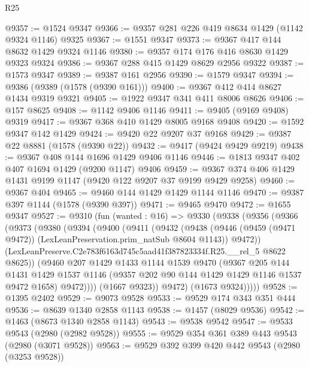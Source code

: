 \begin{lexlean}{R25}
\begin{coremodule}
@9357 := @1524 @9347
@9366 := @9357 @281 @226 @419 @8634 @1429 (@1142 @9324 @1146) @9325
@9367 := @1551 @9347
@9373 := @9367 @417 @144 @8632 @1429 @9324 @1146
@9380 := @9357 @174 @176 @416 @8630 @1429 @9323 @9324
@9386 := @9367 @288 @415 @1429 @8629 @2956 @9322
@9387 := @1573 @9347
@9389 := @9387 @161 @2956
@9390 := @1579 @9347
@9394 := @9386 (@9389 (@1578 (@9390 @161)))
@9400 := @9367 @412 @414 @8627 @1434 @9319 @9321
@9405 := @1922 @9347 @341 @411 @8006 @8626
@9406 := @157 @8625
@9408 := @1142 @9406 @1146
@9411 := @9405 (@9169 @9408) @9319
@9417 := @9367 @368 @410 @1429 @8005 @9168 @9408
@9420 := @1592 @9347 @142 @1429
@9424 := @9420 @22 @9207 @37 @9168
@9429 := @9387 @22 @8881 (@1578 (@9390 @22))
@9432 := @9417 (@9424 @9429 @9219)
@9438 := @9367 @408 @144 @1696 @1429 @9406 @1146
@9446 := @1813 @9347 @402 @407 @1694 @1429 (@9200 @1147) @9406
@9459 := @9367 @374 @406 @1429 @1431 @9199 @1147 (@9420 @122 @9207 @37 @9199 @9429 @9258)
@9460 := @9367 @404
@9465 := @9460 @144 @1429 @1429 @1144 @1146
@9470 := @9387 @397 @1144 (@1578 (@9390 @397))
@9471 := @9465 @9470
@9472 := @1655 @9347
@9527 := @9310
    (fun (wanted : @16) =>
    @9330
      (@9338
        (@9356
          (@9366
            (@9373
              (@9380
                (@9394
                  (@9400
                    (@9411
                      (@9432
                        (@9438
                          (@9446
                            (@9459 (@9471 @9472))
                            (LexLeanPreservation.prim_natSub @8604 @1143))
                          @9472))
                      (LexLeanPreserve.C2e783f6163d745c5aad41f387823334f.R25.__rel_5 @8622 @8625))
                    (@9460
                      @207
                      @1429
                      @1433
                      @1144
                      @1539
                      @9470
                      (@9367
                        @205
                        @144
                        @1431
                        @1429
                        @1537
                        @1146
                        (@9357 @202 @90 @144 @1429 @1429 @1146 @1537 @9472 @1658)
                        @9472))))
                (@1667 @9323))
              @9472)
            (@1673 @9324)))))
@9528 := @1395 @2402
@9529 := @9073 @9528
@9533 := @9529 @174 @343 @351 @444
@9536 := @8639 @1340 @2858 @1143
@9538 := @1457 (@8029 @9536)
@9542 := @1463 (@8673 @1340 @2858 @1143)
@9543 := @9538 @9542
@9547 := @9533 @9543 (@2980 (@2982 @9528))
@9555 := @9529 @354 @361 @389 @443 @9543 (@2980 (@3071 @9528))
@9563 := @9529 @392 @399 @420 @442 @9543 (@2980 (@3253 @9528))

\end{coremodule}
\end{lexlean}
